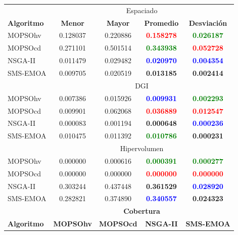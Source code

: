 \begin{table}
 \begin{center}
  \begin{tabular}{|l|cc|cc|} \hline
    & \multicolumn{4}{|c|}{Espaciado} \\ 
	\textbf{Algoritmo} & \textbf{Menor} & \textbf{Mayor} & \textbf{Promedio} & \textbf{Desviaci\'on} \\  \hline \hline
	MOPSOhv &0.128037 & 0.220886 &  \textbf{\textcolor{red}{0.158278}} & \textbf{\textcolor{green}{ 0.026187}}   \\ 
	MOPSOcd &0.271101 & 0.501514 &  \textbf{\textcolor{green}{0.343938}} & \textbf{\textcolor{red}{ 0.052728}}   \\ 
	NSGA-II &0.011479 & 0.029482 & \textbf{\textcolor{blue}{ 0.020970}} &  \textbf{\textcolor{blue}{0.004354}}   \\  
	SMS-EMOA & 0.009705 & 0.020519 & \textbf{0.013185} & \textbf{0.002414}  \\  
	\hline\hline
    & \multicolumn{4}{|c|}{DGI} \\ 
	\hline\hline
	MOPSOhv &0.007386 & 0.015926 & \textbf{\textcolor{blue}{ 0.009931}} & \textbf{\textcolor{green}{0.002293}}  \\ 
	MOPSOcd &0.009901 & 0.062068 & \textbf{\textcolor{red}{ 0.036889}} & \textbf{\textcolor{red}{ 0.012547}}  \\ 
	NSGA-II &0.000083 & 0.001194 & \textbf{0.000648} &  \textbf{\textcolor{blue}{0.000236 }}  \\  
	SMS-EMOA &0.010475 & 0.011392 & \textbf{\textcolor{green}{ 0.010786 }}&  \textbf{0.000231 }  \\  
	\hline\hline
    & \multicolumn{4}{|c|}{Hipervolumen} \\ 
	\hline\hline
	MOPSOhv &0.000000 & 0.000616 & \textbf{\textcolor{green}{ 0.000391 }}& \textbf{\textcolor{green}{ 0.000277  }}  \\ 
	MOPSOcd &0.000000 & 0.000000 & \textbf{\textcolor{red}{ 0.000000 }}& \textbf{\textcolor{red}{ 0.000000 }} \\ 
	NSGA-II &0.303244 & 0.437448 & \textbf{0.361529} &  \textbf{\textcolor{blue}{0.028920 }} \\  
	SMS-EMOA &0.282821 & 0.374890 & \textbf{\textcolor{blue}{ 0.340557 }}& \textbf{0.024323 } \\  
	\hline\hline
	& \multicolumn{4}{|c|}{\textbf{Cobertura}} \\ \hline\hline 
	\textbf{Algoritmo} & \textbf{MOPSOhv} & \textbf{MOPSOcd} & \textbf{NSGA-II} & \textbf{SMS-EMOA} \\  \hline \hline

\end{tabular}
\end{center}
\end{table}
